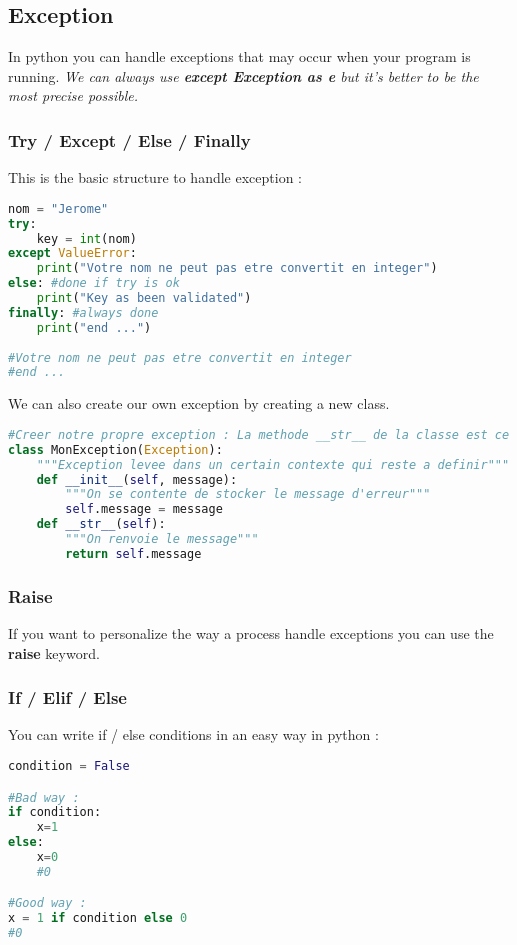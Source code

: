 \documentclass[a4paper, 12pt, titlepage]{scrartcl} %
\begin{document}
\subsection{Exception}
In python you can handle exceptions that may occur when your program is running. \textit{We can always use \textbf{except Exception as e} but it's better to be the most precise possible.}
\subsubsection{Try / Except / Else / Finally}
This is the basic structure to handle exception :
\label{TEEF}
\begin{lstlisting}[language=Python]
nom = "Jerome"
try:
	key = int(nom)
except ValueError:
	print("Votre nom ne peut pas etre convertit en integer")
else: #done if try is ok
	print("Key as been validated")
finally: #always done
	print("end ...")
	
#Votre nom ne peut pas etre convertit en integer
#end ...
\end{lstlisting} \vspace{5mm}

We can also create our own exception by creating a new class.
\begin{lstlisting}[language=Python]
#Creer notre propre exception : La methode __str__ de la classe est ce qui est appele pour afficher le message d'erreur
class MonException(Exception):
    """Exception levee dans un certain contexte qui reste a definir"""
    def __init__(self, message):
        """On se contente de stocker le message d'erreur"""
        self.message = message
    def __str__(self):
        """On renvoie le message"""
        return self.message
\end{lstlisting} \vspace{5mm}

\subsubsection{Raise}
\label{Raise}
If you want to personalize the way a process handle exceptions you can use the \textbf{raise} keyword.


\subsubsection{If / Elif / Else}
\label{IEE}
You can write if / else conditions in an easy way in python :
\begin{lstlisting}[language=Python]
condition = False

#Bad way :
if condition:
	x=1
else:
	x=0
	#0

#Good way :
x = 1 if condition else 0
#0
\end{lstlisting} \vspace{5mm}
\end{document}
